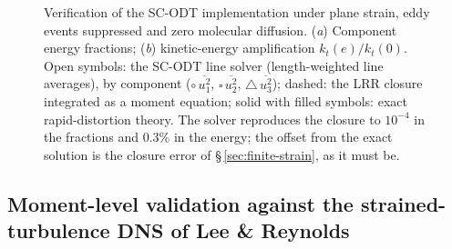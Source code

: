 \documentclass[11pt,a4paper]{article}
\begin{document}
\begin{figure}[!t]
  \centering
  \caption{Verification of the SC-ODT implementation under plane
  strain, eddy events suppressed and zero molecular diffusion.
  (\textit{a}) Component energy fractions; (\textit{b}) kinetic-energy
  amplification $k_t(e)/k_t(0)$. Open symbols: the SC-ODT line solver
  (length-weighted line averages), by component
  ($\circ\,\overline{u_1^2}$, $\square\,\overline{u_2^2}$,
  $\triangle\,\overline{u_3^2}$); dashed: the LRR closure integrated as
  a moment equation; solid with filled symbols: exact rapid-distortion
  theory. The solver reproduces the closure to $10^{-4}$ in the
  fractions and $0.3\%$ in the energy; the offset from the exact
  solution is the closure error of \S\,\ref{sec:finite-strain}, as it
  must be.}
  \label{fig:level1a}
\end{figure}

\subsection{Moment-level validation against the strained-turbulence DNS
of Lee \& Reynolds}\label{sec:lr-validation}\label{sec:lr-plane}
\end{document}
